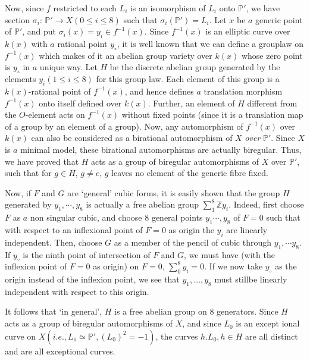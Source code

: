 Now, since $f$ restricted to each $L_i$ is an isomorphism of $L_i$
onto $\mathbb{P}'$, we have section $\sigma_i$:
$\mathbb{P}'\rightarrow X(0 \leq i \leq 8)$   such that $
\sigma_i(\mathbb{P}')=L_i$. Let $x$ be $a$ generic point of
$\mathbb{P}'$, and put   $ \sigma_i(x)=y_i \in f^{-1}(x)$. Since $
f^{-1}(x)$ is an elliptic curve over $k(x)$ with $a$ rational point
$y_\circ$,   it is well known that we can define  a
group\pageoriginale law on 
$f^{-1}(x)$ which    makes of it an abelian group variety over $k(x)$
whose zero point is $y_\circ$  in $a$ unique way. Let $H$ be  the discrete
abelian group generated by the elements $y_i (1 \leq i \leq 8)$ for
this group law. Each element of this group is a $k(x)$-rational point
of $f^{-1}(x)$, and hence defines $a$ translation morphism
$f^{-1}(x)$ onto itself defined over $k(x)$. Further, an element
of $H$ different from the $O$-element acts on $f^{-1}(x)$   without
fixed  points (since it is a translation map of a group by an
element of a group). Now, any automorphism of $f^{-1}(x)$ over
$k(x)$ can also be considered as a  birational automorphism of
$X$ \textit{over} $\mathbb{P}'$. Since $X$ is $a$ minimal model,
these birational automorphisms are actually biregular. Thus, we have
proved that $H$ acts as a group of biregular automorphisms of $X$
over $\mathbb{P}'$,  such   that for $ g \in H$, $g \neq e$,  $g$ leaves
no element of the  generic fibre fixed. 

Now, if $F$ and $G$ are `general' cubic forms,  it is easily shown
that the group $H$  generated by  $y_1, \cdots , y_8$ is actually
a  free abelian group $\sum\limits_1^8  \mathbb{Z} y_i$. Indeed,
first choose $F$ as $a$ non singular cubic, and choose 8 general
points $y_1 \cdots, y_8 $ of $F=0$ such that with respect to an
inflexional point of $F=0$ as origin the $y_i$ are linearly
independent. Then, choose $G$ as a  member of the pencil of cubic
through $y_1,\cdots y_8$. If $y_\circ$ is the ninth point of
intersection of $F$  and $G$, we must have (with the inflexion point
of $F=0$ as origin) on $F=0$, $\sum\limits_0^8 y_i=0$. If we now
take $y_\circ$ as the origin instead of the inflexion point, we see that
$y_1 , \ldots, y_8$ must still\pageoriginale be linearly independent
with respect to this origin.  

It follows that `in general',  $H$ is a free abelian group on 8
generators. Since $H$ acts as a  group of biregular automorphisms of
$X$, and since $L_0$ is an except ional curve  on $ X (i.e., L_o
\simeq \mathbb{P}', (L_0)^2=-1)$,   the curves $h.L_0, h \in H $ are
all distinct and are all exceptional curves. 

